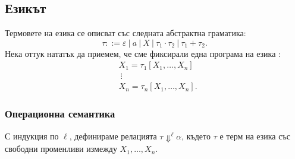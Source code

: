 \subsection{Езикът \CFG}

Термовете на езика \CFG се описват със следната абстрактна граматика:
\[\tau ::= \varepsilon\ |\ a\ |\ X\ |\ \tau_1 \cdot \tau_2\ |\ \tau_1 + \tau_2.\]
Нека оттук нататък да приемем, че сме фиксирали една програма на езика \CFG:
\begin{align*}
  & X_1 = \tau_1[X_1,\dots,X_n]\\
  & \ \vdots\\
  & X_n = \tau_n[X_1,\dots,X_n].
\end{align*}


\subsubsection*{Операционна семантика}

С индукция по $\ell$, дефинираме релацията $\tau \Downarrow^\ell \alpha$,
където $\tau$ е терм на езика \CFG със свободни променливи измежду $X_1,\dots, X_n$.


